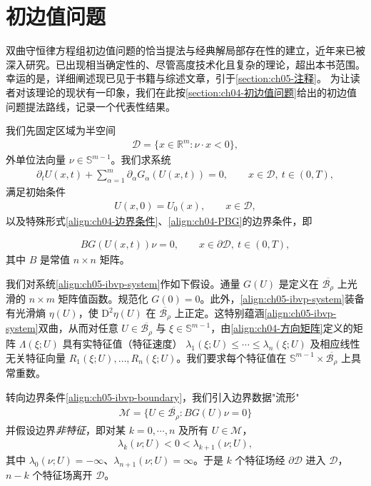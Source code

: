 \documentclass[../../main.tex]{subfiles}
\begin{document}
\section{初边值问题}\label{section:ch05-初边值问题}

双曲守恒律方程组初边值问题的恰当提法与经典解局部存在性的建立，近年来已被深入研究。已出现相当确定性的、尽管高度技术化且复杂的理论，超出本书范围。幸运的是，详细阐述现已见于书籍与综述文章，引于\cref{section:ch05-注释}。
为让读者对该理论的现状有一印象，我们在此按\cref{section:ch04-初边值问题}给出的初边值问题提法路线，记录一个代表性结果。

我们先固定区域为半空间
\begin{align}
\mathscr{D}=\{x\in\mathbb{R}^{m}:\nu\cdot x<0\},\label{align:ch05-halfspace}
\end{align}
外单位法向量 $\nu\in\mathbb{S}^{m-1}$。我们求系统
\begin{align}
\partial_{t}U(x,t)+\sum_{\alpha=1}^{m}\partial_{\alpha}G_{\alpha}(U(x,t))=0,\qquad x\in\mathscr{D},\ t\in(0,T),\label{align:ch05-ibvp-system}
\end{align}
满足初始条件
\begin{align}
U(x,0)=U_{0}(x),\qquad x\in\mathscr{D},\label{align:ch05-ibvp-initial}
\end{align}
以及特殊形式\eqref{align:ch04-边界条件}、\eqref{align:ch04-PBG}的边界条件，即

\begin{align}
BG(U(x,t))\nu=0,\qquad x\in\partial\mathscr{D},\ t\in(0,T),\label{align:ch05-ibvp-boundary}
\end{align}
其中 $B$ 是常值 $n\times n$ 矩阵。

我们对系统\eqref{align:ch05-ibvp-system}作如下假设。通量 $G(U)$ 是定义在 $\overline{\mathscr{B}_{\rho}}$ 上光滑的 $n\times m$ 矩阵值函数。规范化 $G(0)=0$。此外，\eqref{align:ch05-ibvp-system}装备有光滑熵 $\eta(U)$，使 $\mathrm{D}^{2}\eta(U)$ 在 $\overline{\mathscr{B}_{\rho}}$ 上正定。这特别蕴涵\eqref{align:ch05-ibvp-system}双曲，从而对任意 $U\in\overline{\mathscr{B}_{\rho}}$ 与 $\xi\in\mathbb{S}^{m-1}$，由\eqref{align:ch04-方向矩阵}定义的矩阵 $\Lambda(\xi;U)$ 具有实特征值（特征速度）
$\lambda_{1}(\xi;U)\leqslant\cdots\leqslant\lambda_{n}(\xi;U)$ 及相应线性无关特征向量 $R_{1}(\xi;U),\ldots,R_{n}(\xi;U)$。我们要求每个特征值在 $\mathbb{S}^{m-1}\times\overline{\mathscr{B}_{\rho}}$ 上具常重数。

转向边界条件\eqref{align:ch05-ibvp-boundary}，我们引入边界数据"流形"
\begin{align}
\mathscr{M}=\{U\in\overline{\mathscr{B}_{\rho}}:BG(U)\nu=0\}\label{align:ch05-boundary-manifold}
\end{align}
并假设边界\emph{非特征}，即对某 $k=0,\cdots,n$ 及所有 $U\in\mathscr{M}$，
\begin{align}
\lambda_{k}(\nu;U)<0<\lambda_{k+1}(\nu;U),\label{align:ch05-noncharacteristic}
\end{align}
其中 $\lambda_{0}(\nu;U)=-\infty$、$\lambda_{n+1}(\nu;U)=\infty$。于是 $k$ 个特征场经 $\partial\mathscr{D}$ 进入 $\mathscr{D}$，$n-k$ 个特征场离开 $\mathscr{D}$。
\end{document}
